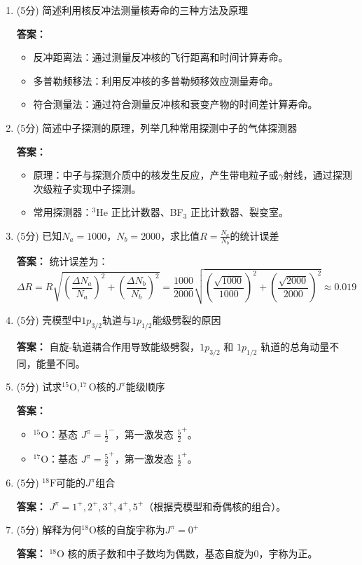 \documentclass{article}
\begin{document}
\begin{enumerate}[label=\arabic*.]
    \item (5分) 简述利用核反冲法测量核寿命的三种方法及原理
    
    \textbf{答案：}
    \begin{itemize}
        \item 反冲距离法：通过测量反冲核的飞行距离和时间计算寿命。
        \item 多普勒频移法：利用反冲核的多普勒频移效应测量寿命。
        \item 符合测量法：通过符合测量反冲核和衰变产物的时间差计算寿命。
    \end{itemize}
    
    \item (5分) 简述中子探测的原理，列举几种常用探测中子的气体探测器
    
    \textbf{答案：}
    \begin{itemize}
        \item 原理：中子与探测介质中的核发生反应，产生带电粒子或\(\gamma\)射线，通过探测次级粒子实现中子探测。
        \item 常用探测器：\( ^3\text{He} \) 正比计数器、BF\(_3\) 正比计数器、裂变室。
    \end{itemize}
    
    \item (5分) 已知$N_a=1000$，$N_b=2000$，求比值$R=\frac{N_a}{N_b}$的统计误差
    
    \textbf{答案：}
    统计误差为：
    \[
    \Delta R = R \sqrt{\left(\frac{\Delta N_a}{N_a}\right)^2 + \left(\frac{\Delta N_b}{N_b}\right)^2} = \frac{1000}{2000} \sqrt{\left(\frac{\sqrt{1000}}{1000}\right)^2 + \left(\frac{\sqrt{2000}}{2000}\right)^2} \approx 0.019
    \]
    
    \item (5分) 壳模型中$1p_{3/2}$轨道与$1p_{1/2}$能级劈裂的原因
    
    \textbf{答案：}
    自旋-轨道耦合作用导致能级劈裂，$1p_{3/2}$ 和 $1p_{1/2}$ 轨道的总角动量不同，能量不同。
    
    \item (5分) 试求$^{15}\text{O},^{17}\text{O}$核的$J^{\pi}$能级顺序
    
    \textbf{答案：}
    \begin{itemize}
        \item $^{15}\text{O}$：基态 \( J^\pi = \frac{1}{2}^- \)，第一激发态 \( \frac{5}{2}^+ \)。
        \item $^{17}\text{O}$：基态 \( J^\pi = \frac{5}{2}^+ \)，第一激发态 \( \frac{1}{2}^+ \)。
    \end{itemize}
    
    \item (5分) $^{18}\text{F}$可能的$J^{\pi}$组合
    
    \textbf{答案：}
    \( J^\pi = 1^+, 2^+, 3^+, 4^+, 5^+ \)（根据壳模型和奇偶核的组合）。
    
    \item (5分) 解释为何$^{18}\text{O}$核的自旋宇称为$J^{\pi}=0^+$
    
    \textbf{答案：}
    $^{18}\text{O}$ 核的质子数和中子数均为偶数，基态自旋为0，宇称为正。
\end{enumerate}
\end{document}

